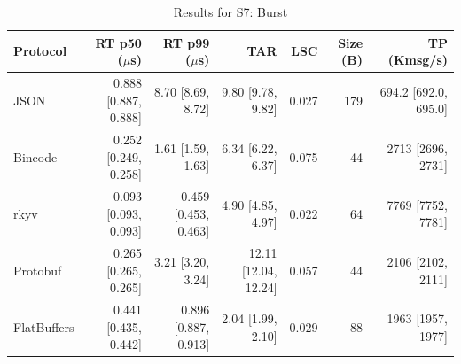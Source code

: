 \begin{table}[htbp]
\centering
\caption{Results for S7: Burst}
\label{tab:results_burst}
\begin{tabular}{l r r r r r r}
\hline
Protocol & RT p50 ($\mu$s) & RT p99 ($\mu$s) & TAR & LSC & Size (B) & TP (Kmsg/s) \\
\hline
  JSON & 0.888 [0.887, 0.888] & 8.70 [8.69, 8.72] & 9.80 [9.78, 9.82] & 0.027 & 179 & 694.2 [692.0, 695.0] \\
  Bincode & 0.252 [0.249, 0.258] & 1.61 [1.59, 1.63] & 6.34 [6.22, 6.37] & 0.075 & 44 & 2713 [2696, 2731] \\
  rkyv & 0.093 [0.093, 0.093] & 0.459 [0.453, 0.463] & 4.90 [4.85, 4.97] & 0.022 & 64 & 7769 [7752, 7781] \\
  Protobuf & 0.265 [0.265, 0.265] & 3.21 [3.20, 3.24] & 12.11 [12.04, 12.24] & 0.057 & 44 & 2106 [2102, 2111] \\
  FlatBuffers & 0.441 [0.435, 0.442] & 0.896 [0.887, 0.913] & 2.04 [1.99, 2.10] & 0.029 & 88 & 1963 [1957, 1977] \\
\hline
\end{tabular}
\end{table}